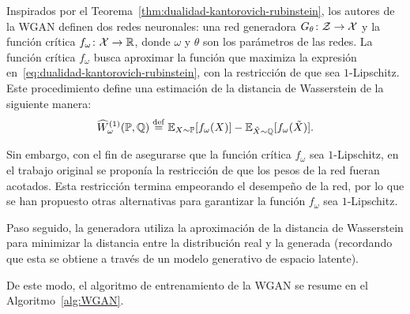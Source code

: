 {{    Inspirados por el Teorema~\ref{thm:dualidad-kantorovich-rubinstein}, los autores de la WGAN definen dos redes neuronales: una red generadora $G_\theta\colon\mathcal{Z}\to\mathcal{X}$ y la función crítica $f_\omega \colon \mathcal{X} \to \mathbb{R}$, donde $\omega$ y $\theta$ son los parámetros de las redes. La función crítica $f_\omega$ busca aproximar la función que maximiza la expresión en~\eqref{eq:dualidad-kantorovich-rubinstein}, con la restricción de que sea $1$-Lipschitz. Este procedimiento define una estimación de la distancia de Wasserstein de la siguiente manera:
    \begin{equation}\label{eq:wasserstein-estimation}
        \widehat W_\omega^{(1)} (\Prob, \ProbQ) \eqdef \Exp_{X\sim \Prob} [f_\omega(X)] - \Exp_{\tilde X \sim \ProbQ} [f_\omega(\tilde X)].
    \end{equation}

    Sin embargo, con el fin de asegurarse que la función crítica $f_\omega$ sea $1$-Lipschitz, en el trabajo original se proponía la restricción de que los pesos de la red fueran acotados. Esta restricción termina empeorando el desempeño de la red, por lo que se han propuesto otras alternativas para garantizar la función $f_\omega$ sea $1$-Lipschitz.

    Paso seguido, la generadora utiliza la aproximación de la distancia de Wasserstein para minimizar la distancia entre la distribución real y la generada (recordando que esta se obtiene a través de un modelo generativo de espacio latente).

    De este modo, el algoritmo de entrenamiento de la WGAN se resume en el Algoritmo~\ref{alg:WGAN}.

}}
